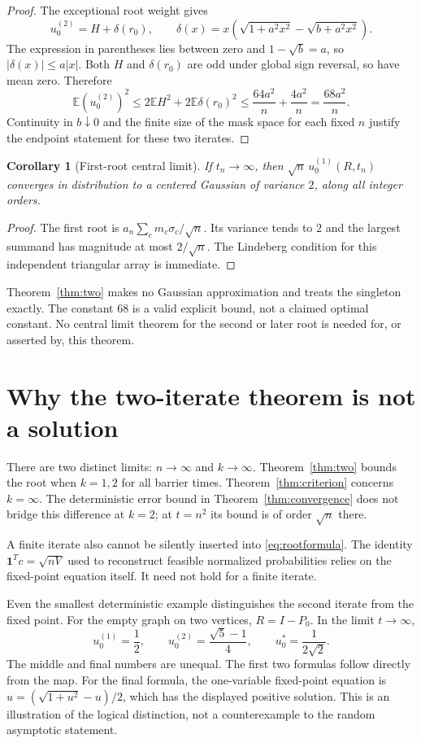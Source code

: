 \documentclass[11pt]{article}
\newtheorem{corollary}[theorem]{Corollary}
\theoremstyle{remark}\newtheorem{remark}[theorem]{Remark}
\newcommand{\E}{\mathbb E}
\newcommand{\one}{\mathbf 1}
\newcommand{\sgn}{\sigma}
\begin{document}
\begin{proof}
The exceptional root weight gives
\[
 u^{(2)}_0=H+\delta(r_0),\qquad
 \delta(x)=x\left(\sqrt{1+a^2x^2}-\sqrt{b+a^2x^2}\right).
\]
The expression in parentheses lies between zero and $1-\sqrt b=a$, so
$|\delta(x)|\le a|x|$. Both $H$ and $\delta(r_0)$ are odd under global
sign reversal, so have mean zero. Therefore
\[
 \E(u^{(2)}_0)^2\le2\E H^2+2\E\delta(r_0)^2
 \le\frac{64a^2}{n}+\frac{4a^2}{n}=\frac{68a^2}{n}.
\]
Continuity in $b\downarrow0$ and the finite size of the mask space for each
fixed $n$ justify the endpoint statement for these two iterates.
\end{proof}

\begin{corollary}[First-root central limit]\label{cor:clt}
If $t_n\to\infty$, then $\sqrt n\,u^{(1)}_0(R,t_n)$ converges in distribution
to a centered Gaussian of variance $2$, along all integer orders.
\end{corollary}
\begin{proof}
The first root is $a_n\sum_cm_c\sgn_c/\sqrt n$. Its variance tends to $2$
and the largest summand has magnitude at most $2/\sqrt n$. The Lindeberg
condition for this independent triangular array is immediate.
\end{proof}

Theorem~\ref{thm:two} makes no Gaussian approximation and treats the singleton
exactly. The constant $68$ is a valid explicit bound, not a claimed optimal
constant. No central limit theorem for the second or later root is needed
for, or asserted by, this theorem.

\section{Why the two-iterate theorem is not a solution}
There are two distinct limits: $n\to\infty$ and $k\to\infty$.
Theorem~\ref{thm:two} bounds the root when $k=1,2$ for all barrier times.
Theorem~\ref{thm:criterion} concerns $k=\infty$. The deterministic error
bound in Theorem~\ref{thm:convergence} does not bridge this difference at
$k=2$; at $t=n^2$ its bound is of order $\sqrt n$ there.

A finite iterate also cannot be silently inserted into
\eqref{eq:rootformula}. The identity $\one^Tc=\sqrt{nV}$ used to reconstruct
feasible normalized probabilities relies on the fixed-point equation itself.
It need not hold for a finite iterate.

Even the smallest deterministic example distinguishes the second iterate
from the fixed point. For the empty graph on two vertices,
$R=I-P_0$. In the limit $t\to\infty$,
\[
 u^{(1)}_0=\frac12,\qquad
 u^{(2)}_0=\frac{\sqrt5-1}{4},\qquad
 u^*_0=\frac1{2\sqrt2}.
\]
The middle and final numbers are unequal. The first two formulas follow
directly from the map. For the final formula, the one-variable fixed-point
equation is $u=(\sqrt{1+u^2}-u)/2$, which has the displayed positive
solution. This is an illustration of the logical distinction, not a
counterexample to the random asymptotic statement.
\end{document}

